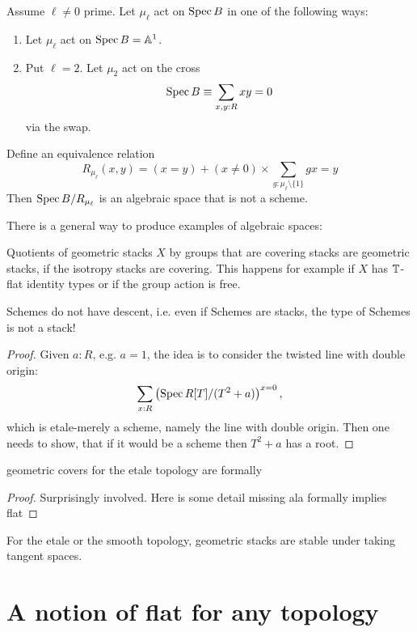 \documentclass{article}
\begin{document}
	
	\begin{example}
		Assume $\ell \neq 0$ prime. Let $\mu_\ell$ act on $\operatorname{Spec} B$ in one of the following ways:
		\begin{enumerate}
			\item Let $\mu_\ell$ act on $\operatorname{Spec} B = \mathbb{A}^1$. 
			\item Put $\ell= 2$. Let $\mu_2$ act on the cross
			\[
			\operatorname{Spec} B \equiv \sum_{x , y : R} x y = 0
			\]
			via the swap.
		\end{enumerate}
		Define an equivalence relation
		\[
		R_{\mu_\ell}(x,y) = (x = y) + (x \neq 0) \times \sum_{g : \mu_\ell \setminus \{1\}} g x = y
		\]
		Then $\operatorname{Spec} B / R_{\mu_\ell}$ is an algebraic space that is not a scheme.
	\end{example}
	There is a general way to produce examples of algebraic spaces:
	\begin{lemma}
		Quotients of geometric stacks $X$ by groups that are covering stacks are geometric stacks, if the isotropy stacks are covering. This happens for example if $X$ has $\mathbb{T}$-flat identity types or if the group action is free.    
	\end{lemma}
	\begin{theorem}
		Schemes do not have descent, i.e. even if Schemes are stacks, the type of Schemes is not a stack!
	\end{theorem}
	\begin{proof}
	Given $a : R$, e.g. $a = 1$, the idea is to consider the twisted line with double origin:
		\[\sum_{x : R} \left(\operatorname{Spec} R[T]/(T^2+a)\right)^{x = 0},\]
		which is etale-merely a scheme, namely the line with double origin. Then one needs to show, that if it would be a scheme then $T^2 + a$ has a root.		
	\end{proof}	
	\begin{theorem}
		geometric covers for the etale topology are formally \etale
	\end{theorem}
	\begin{proof}
		Surprisingly involved. Here is some detail missing ala formally \etale implies flat
	\end{proof}
	\begin{prop}
		For the etale or the smooth topology, geometric stacks are stable under taking tangent spaces.
	\end{prop}
	\section{A notion of flat for any topology}
	
\end{document}
